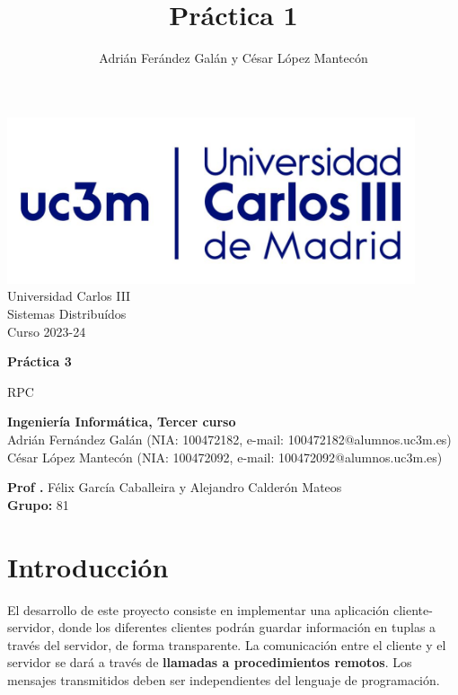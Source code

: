 \documentclass[]{article}
\title{Práctica 1}
\author{Adrián Ferández Galán y César López Mantecón}
\begin{document}
\begin{titlepage}
    \centering
   \includegraphics[width=0.9\textwidth]{uc3m.jpg} 
    {\Huge Universidad Carlos III\\
    
     \Large Sistemas Distribuídos\\
     \vspace{0.5cm}
     Curso 2023-24}
    \vspace{2cm}

    {\Huge \textbf{Práctica 3} \par}
    \vspace{0.5cm}
    {\Large RPC \par}
    \vspace{8cm}

   \textbf{Ingeniería Informática, Tercer curso}\\
    \vspace{0.2cm} 
    Adrián Fernández Galán (NIA: 100472182, e-mail: 100472182@alumnos.uc3m.es) \\
    César López Mantecón   (NIA: 100472092, e-mail: 100472092@alumnos.uc3m.es)
    \vspace{0.5cm}

   
    \textbf{Prof .} Félix García Caballeira y Alejandro Calderón Mateos\\
    
    \textbf{Grupo: } 81   
    
\end{titlepage}
\newpage

\renewcommand{\contentsname}{\centering Índice}
\tableofcontents

\newpage

\section{Introducción}
\label{sec:introduccion}
El desarrollo de este proyecto consiste en implementar una aplicación cliente-servidor, donde los diferentes clientes podrán guardar información en tuplas a través del servidor, de forma transparente. La comunicación entre el cliente y el servidor se dará a través de \textbf{llamadas a procedimientos remotos}. Los mensajes transmitidos deben ser independientes del lenguaje de programación. 
\end{document}
